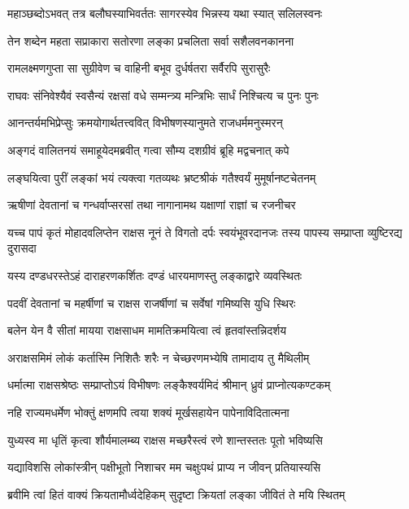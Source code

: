 \twolineshloka
{महाञ्छब्दोऽभवत् तत्र बलौघस्याभिवर्ततः}
{सागरस्येव भिन्नस्य यथा स्यात् सलिलस्वनः} %

\twolineshloka
{तेन शब्देन महता सप्राकारा सतोरणा}
{लङ्का प्रचलिता सर्वा सशैलवनकानना} %

\twolineshloka
{रामलक्ष्मणगुप्ता सा सुग्रीवेण च वाहिनी}
{बभूव दुर्धर्षतरा सर्वैरपि सुरासुरैः} %

\twolineshloka
{राघवः संनिवेश्यैवं स्वसैन्यं रक्षसां वधे}
{सम्मन्त्र्य मन्त्रिभिः सार्धं निश्चित्य च पुनः पुनः} %

\twolineshloka
{आनन्तर्यमभिप्रेप्सुः क्रमयोगार्थतत्त्ववित्}
{विभीषणस्यानुमते राजधर्ममनुस्मरन्} %

\twolineshloka
{अङ्गदं वालितनयं समाहूयेदमब्रवीत्}
{गत्वा सौम्य दशग्रीवं ब्रूहि मद्वचनात् कपे} %

\twolineshloka
{लङ्घयित्वा पुरीं लङ्कां भयं त्यक्त्वा गतव्यथः}
{भ्रष्टश्रीकं गतैश्वर्यं मुमूर्षानष्टचेतनम्} %

\twolineshloka
{ऋषीणां देवतानां च गन्धर्वाप्सरसां तथा}
{नागानामथ यक्षाणां राज्ञां च रजनीचर} %

\threelineshloka
{यच्च पापं कृतं मोहादवलिप्तेन राक्षस}
{नूनं ते विगतो दर्पः स्वयंभूवरदानजः}
{तस्य पापस्य सम्प्राप्ता व्युष्टिरद्य दुरासदा} %

\twolineshloka
{यस्य दण्डधरस्तेऽहं दाराहरणकर्शितः}
{दण्डं धारयमाणस्तु लङ्काद्वारे व्यवस्थितः} %

\twolineshloka
{पदवीं देवतानां च महर्षीणां च राक्षस}
{राजर्षीणां च सर्वेषां गमिष्यसि युधि स्थिरः} %

\twolineshloka
{बलेन येन वै सीतां मायया राक्षसाधम}
{मामतिक्रमयित्वा त्वं हृतवांस्तन्निदर्शय} %

\twolineshloka
{अराक्षसमिमं लोकं कर्तास्मि निशितैः शरैः}
{न चेच्छरणमभ्येषि तामादाय तु मैथिलीम्} %

\twolineshloka
{धर्मात्मा राक्षसश्रेष्ठः सम्प्राप्तोऽयं विभीषणः}
{लङ्कैश्वर्यमिदं श्रीमान् ध्रुवं प्राप्नोत्यकण्टकम्} %

\twolineshloka
{नहि राज्यमधर्मेण भोक्तुं क्षणमपि त्वया}
{शक्यं मूर्खसहायेन पापेनाविदितात्मना} %

\twolineshloka
{युध्यस्व मा धृतिं कृत्वा शौर्यमालम्ब्य राक्षस}
{मच्छरैस्त्वं रणे शान्तस्ततः पूतो भविष्यसि} %

\twolineshloka
{यद्याविशसि लोकांस्त्रीन् पक्षीभूतो निशाचर}
{मम चक्षुःपथं प्राप्य न जीवन् प्रतियास्यसि} %

\twolineshloka
{ब्रवीमि त्वां हितं वाक्यं क्रियतामौर्ध्वदेहिकम्}
{सुदृष्टा क्रियतां लङ्का जीवितं ते मयि स्थितम्} %

